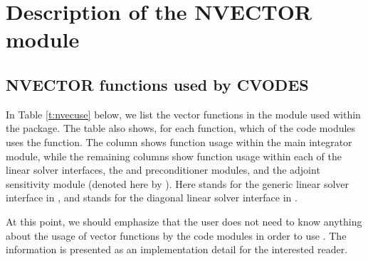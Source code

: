 \chapter{Description of the NVECTOR module}\label{s:nvector}



\section{NVECTOR functions used by CVODES}

In Table \ref{t:nvecuse} below, we list the vector functions in the 
{\nvector} module used within the {\cvodes} package.
The table also shows, for each function, which of the code modules uses
the function. The {\cvodes} column shows function usage within the main
integrator module, while the remaining columns show function usage
within each of the {\cvodes} linear solver interfaces, the {\cvbandpre} and
{\cvbbdpre} preconditioner modules, and the {\cvodes} adjoint sensitivity
module (denoted here by {\cvodea}).  Here
{\cvls} stands for the generic linear solver interface in {\cvodes},
and {\cvdiag} stands for the diagonal linear solver interface in {\cvodes}.

At this point, we should emphasize that the {\cvodes} user does not need to know 
anything about the usage of vector functions by the {\cvodes} code modules in order 
to use {\cvodes}. The information is presented as an implementation detail for the 
interested reader.

